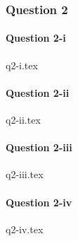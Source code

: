 \documentclass[crop=false,fleqn]{standalone}
\begin{document}
    \subsubsection{Question 2}

    \paragraph{Question 2-i}
    {q2-i.tex}

    \paragraph{Question 2-ii}
    {q2-ii.tex}

    \paragraph{Question 2-iii}
    {q2-iii.tex}

    \paragraph{Question 2-iv}
    {q2-iv.tex}
\end{document}
